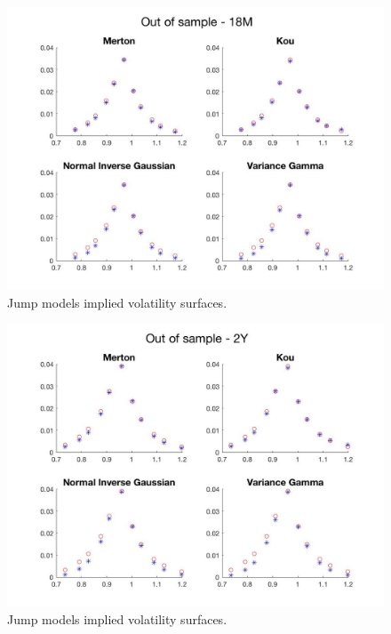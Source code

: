\begin{figure}[!htb]
\centering
	\includegraphics[width=\textwidth]{gfx/out_18m}
	\caption{Jump models implied volatility surfaces.}
	\label{fig:out_18m}
\end{figure}
\begin{figure}[!htb]
\centering
	\includegraphics[width=\textwidth]{gfx/out_2y}
	\caption{Jump models implied volatility surfaces.}
	\label{fig:out_2y}
\end{figure}

